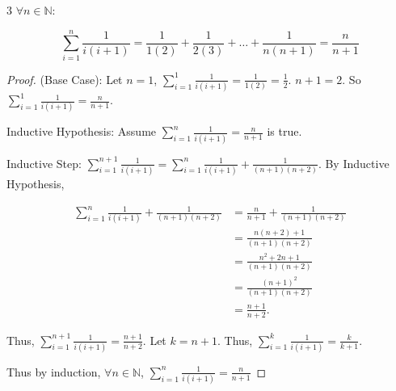 \documentclass{article}
\newcommand{\N}{\mathbb{N}}
\begin{document}
\begin{PROB}{3}\label{Problem 3.}
    $\forall n \in \N$:
    
    \[
        \sum_{i = 1}^{n} \frac{1}{i(i + 1)} = \frac{1}{1(2)} + \frac{1}{2(3)} + \dots + \frac{1}{n(n + 1)} = \frac{n}{n + 1}
    \] 
\end{PROB}
\begin{proof}
    (Base Case): Let $n = 1$, $\sum_{i = 1}^{1} \frac{1}{i(i + 1)} = \frac{1}{1(2)} = \frac{1}{2}$. $n + 1 = 2$. So $\sum_{i = 1}^{1} \frac{1}{i(i + 1)} = \frac{n}{n+1}$.

    Inductive Hypothesis: Assume $\sum_{i = 1}^{n} \frac{1}{i(i + 1)} = \frac{n}{n + 1}$ is true.

    Inductive Step: $\sum_{i = 1}^{n + 1} \frac{1}{i(i + 1)} = \sum_{i = 1}^{n} \frac{1}{i(i + 1)} + \frac{1}{(n + 1)(n + 2)}$. By Inductive Hypothesis, 
    
    \begin{align*}
        \sum_{i = 1}^{n} \frac{1}{i(i + 1)} + \frac{1}{(n + 1)(n + 2)} &= \frac{n}{n + 1}+ \frac{1}{(n + 1)(n + 2)} \\
        &= \frac{n(n + 2) + 1}{(n + 1)(n+2)} \\
        &= \frac{n^2 + 2n + 1}{(n + 1)(n + 2)} \\
        &= \frac{(n + 1)^2}{(n + 1)(n + 2)} \\
        &= \frac{n + 1}{n + 2}.
    \end{align*}

    Thus, $\sum_{i = 1}^{n + 1} \frac{1}{i(i + 1)} = \frac{n + 1}{n + 2}$. Let $k = n +1$. Thus, $\sum_{i = 1}^{k} \frac{1}{i(i + 1)} = \frac{k}{k + 1}$.    

    Thus by induction, $\forall n \in \N$,
    $\sum_{i = 1}^{n} \frac{1}{i(i + 1)} = \frac{n}{n + 1}$
\end{proof}

\bigskip
\end{document}
